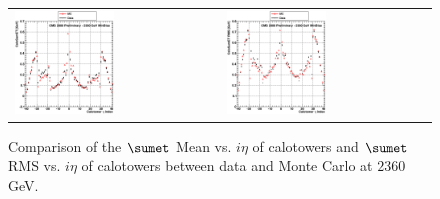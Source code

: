 \begin{figure}[h!]
 \centering
 \begin{tabular}{ll}
  \includegraphics[width=0.5\textwidth]{plots_DataVsMC_MB_2360GeV/g_caloSumetMean_vs_ieta_2360.eps} &
  \includegraphics[width=0.5\textwidth]{plots_DataVsMC_MB_2360GeV/g_caloSumetRMS_vs_ieta_2360.eps} \\
 \end{tabular}
 \caption{\small Comparison of the $\sumet$ Mean vs. $i\eta$ of calotowers and $\sumet$ RMS vs. $i\eta$ of calotowers between 
          data and Monte Carlo at $2360$ GeV.\label{fig:SumET_MeanRMS_vs_ieta_2360}}
\end{figure}

